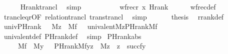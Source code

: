 \begin{isabellebody}
\ \ \ \ \isamarkupfalse%
\ Hrank{\isacharunderscore}{\kern0pt}trancl\ \isamarkupfalse%
\ simp\isanewline
\ \ \isamarkupfalse%
\isanewline
\ \ \isamarkupfalse%
\ {\isachardoublequoteopen}\ {\isachardot}{\kern0pt}{\isachardot}{\kern0pt}{\isachardot}{\kern0pt}\ {\isacharequal}{\kern0pt}\ \ wfrec{\isacharparenleft}{\kern0pt}{\isacharquery}{\kern0pt}r{\isacharcircum}{\kern0pt}{\isacharplus}{\kern0pt}{\isacharcomma}{\kern0pt}\ x{\isacharcomma}{\kern0pt}\ Hrank{\isacharparenright}{\kern0pt}{\isachardoublequoteclose}\isanewline
\ \ \ \ \isamarkupfalse%
\ wfrec{\isacharunderscore}{\kern0pt}def\ \isamarkupfalse%
\ trancl{\isacharunderscore}{\kern0pt}eq{\isacharunderscore}{\kern0pt}r{\isacharbrackleft}{\kern0pt}OF\ relation{\isacharunderscore}{\kern0pt}trancl\ trans{\isacharunderscore}{\kern0pt}trancl{\isacharbrackright}{\kern0pt}\ \isamarkupfalse%
\ simp\isanewline
\ \ \isamarkupfalse%
\isanewline
\ \ \isamarkupfalse%
\ {\isacharquery}{\kern0pt}thesis\ \isamarkupfalse%
\ rrank{\isacharunderscore}{\kern0pt}def\ \isacommand{{\isachardot}{\kern0pt}}\isamarkupfalse%
\isanewline
{}\isamarkupfalse%
%
\endisatagproof
{\isafoldproof}%
%
\isadelimproof
\isanewline
%
\endisadelimproof
\isanewline
{}\isamarkupfalse%
\ univ{\isacharunderscore}{\kern0pt}PHrank\ {\isacharcolon}{\kern0pt}\ {\isachardoublequoteopen}{\isasymlbrakk}\ M{\isacharparenleft}{\kern0pt}z{\isacharparenright}{\kern0pt}\ {\isacharsemicolon}{\kern0pt}\ M{\isacharparenleft}{\kern0pt}f{\isacharparenright}{\kern0pt}\ {\isasymrbrakk}\ {\isasymLongrightarrow}\ univalent{\isacharparenleft}{\kern0pt}M{\isacharcomma}{\kern0pt}z{\isacharcomma}{\kern0pt}PHrank{\isacharparenleft}{\kern0pt}M{\isacharcomma}{\kern0pt}f{\isacharparenright}{\kern0pt}{\isacharparenright}{\kern0pt}{\isachardoublequoteclose}\ \isanewline
%
\isadelimproof
\ \ %
\endisadelimproof
%
\isatagproof
{}\isamarkupfalse%
\ univalent{\isacharunderscore}{\kern0pt}def\ PHrank{\isacharunderscore}{\kern0pt}def\ \isamarkupfalse%
\ simp%
\endisatagproof
{\isafoldproof}%
%
\isadelimproof
\isanewline
%
\endisadelimproof
\isanewline
\isanewline
{}\isamarkupfalse%
\ PHrank{\isacharunderscore}{\kern0pt}abs\ {\isacharcolon}{\kern0pt}\isanewline
\ \ \ \ {\isachardoublequoteopen}{\isasymlbrakk}\ M{\isacharparenleft}{\kern0pt}f{\isacharparenright}{\kern0pt}\ {\isacharsemicolon}{\kern0pt}\ M{\isacharparenleft}{\kern0pt}y{\isacharparenright}{\kern0pt}\ {\isasymrbrakk}\ {\isasymLongrightarrow}\ PHrank{\isacharparenleft}{\kern0pt}M{\isacharcomma}{\kern0pt}f{\isacharcomma}{\kern0pt}y{\isacharcomma}{\kern0pt}z{\isacharparenright}{\kern0pt}\ {\isasymlongleftrightarrow}\ M{\isacharparenleft}{\kern0pt}z{\isacharparenright}{\kern0pt}\ {\isasymand}\ z\ {\isacharequal}{\kern0pt}\ succ{\isacharparenleft}{\kern0pt}f{\isacharbackquote}{\kern0pt}y{\isacharparenright}{\kern0pt}{\isachardoublequoteclose}\isanewline

\end{isabellebody}

